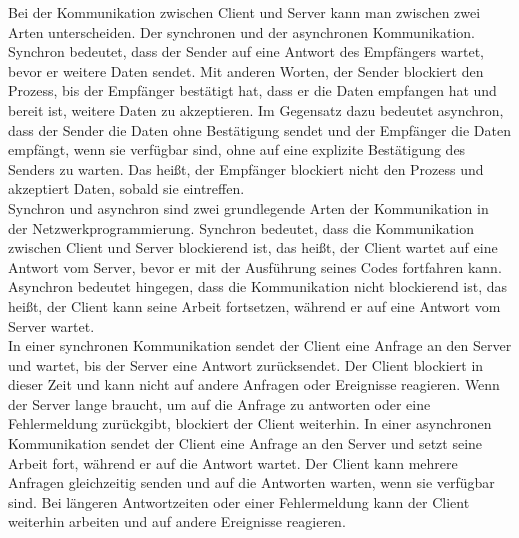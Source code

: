 \documentclass[thesis.tex]{subfiles}
\begin{document}
Bei der Kommunikation zwischen Client und Server kann man zwischen zwei Arten unterscheiden.
Der synchronen und der asynchronen Kommunikation.
Synchron bedeutet, dass der Sender auf eine Antwort des Empfängers wartet, bevor er weitere Daten sendet.
Mit anderen Worten, der Sender blockiert den Prozess, bis der Empfänger bestätigt hat, dass er die Daten empfangen hat und bereit ist, weitere Daten zu akzeptieren.
Im Gegensatz dazu bedeutet asynchron, dass der Sender die Daten ohne Bestätigung sendet und der Empfänger die Daten empfängt, wenn sie verfügbar sind, ohne auf eine explizite Bestätigung des Senders zu warten.
Das heißt, der Empfänger blockiert nicht den Prozess und akzeptiert Daten, sobald sie eintreffen.
\\

Synchron und asynchron sind zwei grundlegende Arten der Kommunikation in der Netzwerkprogrammierung.
Synchron bedeutet, dass die Kommunikation zwischen Client und Server blockierend ist, das heißt, der Client wartet auf eine Antwort vom Server, bevor er mit der Ausführung seines Codes fortfahren kann.
Asynchron bedeutet hingegen, dass die Kommunikation nicht blockierend ist, das heißt, der Client kann seine Arbeit fortsetzen, während er auf eine Antwort vom Server wartet.
\\

In einer synchronen Kommunikation sendet der Client eine Anfrage an den Server und wartet, bis der Server eine Antwort zurücksendet.
Der Client blockiert in dieser Zeit und kann nicht auf andere Anfragen oder Ereignisse reagieren.
Wenn der Server lange braucht, um auf die Anfrage zu antworten oder eine Fehlermeldung zurückgibt, blockiert der Client weiterhin.
In einer asynchronen Kommunikation sendet der Client eine Anfrage an den Server und setzt seine Arbeit fort, während er auf die Antwort wartet.
Der Client kann mehrere Anfragen gleichzeitig senden und auf die Antworten warten, wenn sie verfügbar sind.
Bei längeren Antwortzeiten oder einer Fehlermeldung kann der Client weiterhin arbeiten und auf andere Ereignisse reagieren.
\cite[vgl. S.1-3]{lim2019directly}
\\
\end{document}
